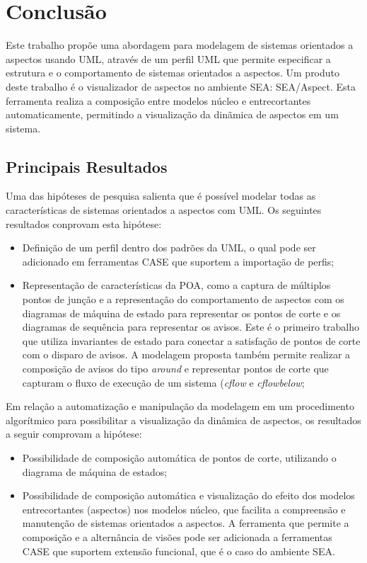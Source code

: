 \chapter{Conclusão}

Este trabalho propõe uma abordagem para modelagem de sistemas orientados a aspectos usando UML, através de um perfil UML que permite especificar a
estrutura e o comportamento de sistemas orientados a aspectos. Um produto deste trabalho é o visualizador de aspectos no
ambiente SEA: SEA/Aspect. Esta ferramenta realiza a composição entre modelos núcleo e entrecortantes automaticamente, permitindo a
visualização da dinãmica de aspectos em um sistema.

\section{Principais Resultados}

Uma das hipóteses de pesquisa salienta que é possível modelar todas as características de sistemas orientados a aspectos com UML. Os seguintes
resultados conprovam esta hipótese:

\begin{itemize}
	\item Definição de um perfil dentro dos padrões da UML, o qual pode ser adicionado em ferramentas CASE que suportem a importação
	de perfis; 
	\item Representação de características da POA, como a captura de múltiplos pontos de junção e a representação do comportamento de
	aspectos com os diagramas de máquina de estado para representar os pontos de corte e os diagramas de sequência para representar os avisos. Este é o primeiro
	trabalho que utiliza invariantes de estado para conectar a satisfação de pontos de corte com o disparo de avisos. A modelagem proposta também permite
	realizar a composição de avisos do tipo \textit{around} e representar pontos de corte que capturam o fluxo de execução de um sistema (\textit{cflow}
	e \textit{cflowbelow};
\end{itemize}

Em relação a automatização e manipulação da modelagem em um procedimento algorítmico para possibilitar a visualização da dinâmica de aspectos, os
resultados a seguir comprovam a hipótese:

\begin{itemize}
\item Possibilidade de composição automática de pontos de corte, utilizando o diagrama de máquina de estados;
\item Possibilidade de composição automática e visualização do efeito dos modelos entrecortantes (aspectos) nos modelos núcleo, que facilita
a compreensão e manutenção de sistemas orientados a aspectos. A ferramenta que permite a composição e a alternância de visões pode ser adicionada a ferramentas CASE 
que suportem extensão funcional, que é o caso do ambiente SEA.
\end{itemize}

